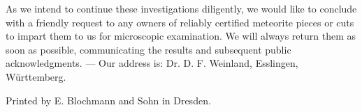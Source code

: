 \documentclass[a4paper, 12pt, oneside]{article}
\begin{document}
As we intend to continue these investigations diligently, we would like to conclude with a friendly request to any owners of reliably certified meteorite pieces or cuts to impart them to us for microscopic examination. We will always return them as soon as possible, communicating the results and subsequent public acknowledgments. --- Our address is: Dr. D. F. Weinland, Esslingen, Württemberg.

Printed by E. Blochmann and Sohn in Dresden.
\clearpage
\end{document}
